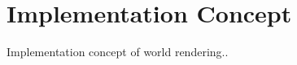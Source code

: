 \chapter{Implementation Concept}\label{implementation_concept}

Implementation concept of world rendering..


\newpage
